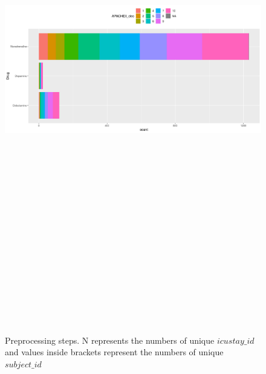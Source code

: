 \documentclass[10pt,a4paper]{article}
\begin{document}
\begin{figure}[htp]
\begin{center}
  \includegraphics[width=14cm,height=23cm]{images/numberSamples_APACHEgroups.png}
\end{center}
\caption{Preprocessing steps. N represents the numbers of unique $icustay\_id$ and values inside brackets represent the numbers of unique $subject\_id$}
\label{fig:preprocessingPipeline}
\end{figure}
\end{document}

